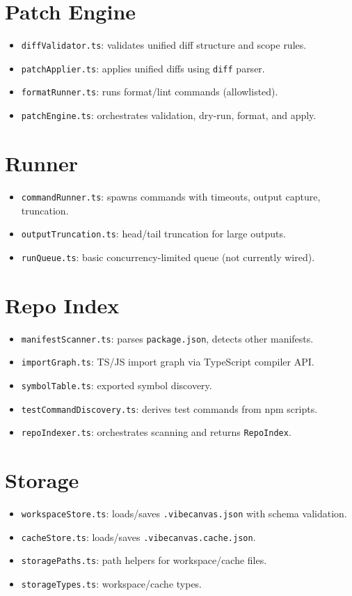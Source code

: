 \documentclass[11pt]{article}
\begin{document}
\section{Patch Engine}
\begin{itemize}[noitemsep]
  \item \texttt{diffValidator.ts}: validates unified diff structure and scope rules.
  \item \texttt{patchApplier.ts}: applies unified diffs using \texttt{diff} parser.
  \item \texttt{formatRunner.ts}: runs format/lint commands (allowlisted).
  \item \texttt{patchEngine.ts}: orchestrates validation, dry-run, format, and apply.
\end{itemize}

\section{Runner}
\begin{itemize}[noitemsep]
  \item \texttt{commandRunner.ts}: spawns commands with timeouts, output capture, truncation.
  \item \texttt{outputTruncation.ts}: head/tail truncation for large outputs.
  \item \texttt{runQueue.ts}: basic concurrency-limited queue (not currently wired).
\end{itemize}

\section{Repo Index}
\begin{itemize}[noitemsep]
  \item \texttt{manifestScanner.ts}: parses \texttt{package.json}, detects other manifests.
  \item \texttt{importGraph.ts}: TS/JS import graph via TypeScript compiler API.
  \item \texttt{symbolTable.ts}: exported symbol discovery.
  \item \texttt{testCommandDiscovery.ts}: derives test commands from npm scripts.
  \item \texttt{repoIndexer.ts}: orchestrates scanning and returns \texttt{RepoIndex}.
\end{itemize}

\section{Storage}
\begin{itemize}[noitemsep]
  \item \texttt{workspaceStore.ts}: loads/saves \texttt{.vibecanvas.json} with schema validation.
  \item \texttt{cacheStore.ts}: loads/saves \texttt{.vibecanvas.cache.json}.
  \item \texttt{storagePaths.ts}: path helpers for workspace/cache files.
  \item \texttt{storageTypes.ts}: workspace/cache types.
\end{itemize}
\end{document}

